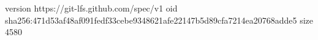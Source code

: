 version https://git-lfs.github.com/spec/v1
oid sha256:471d53af48af091fedf33cebe9348621afe22147b5d89cfa7214ea20768adde5
size 4580
